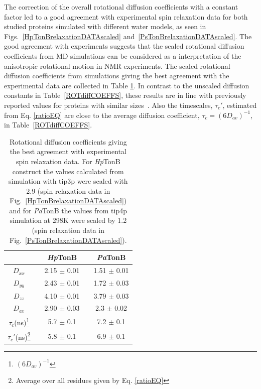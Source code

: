 \documentclass[pre,aps,floatfix,authordate1-4,twocolumn]{revtex4-1}
\begin{document}
The correction of the overall rotational diffusion coefficients
with a constant factor led to a good agreement with experimental
spin relaxation data for both studied proteins simulated with different water models,
as seen in Figs.~\ref{HpTonBrelaxationDATAscaled} and~\ref{PsTonBrelaxationDATAscaled}.
The good agreement with experiments suggests that the scaled rotational diffusion coefficients
from MD simulations can be considered as a interpretation of the anisotropic rotational motion in NMR experiments.
The scaled rotational diffusion coefficients from simulations giving the best agreement
with the experimental data are collected in Table \ref{ROTdiffCOEFFSscaled}.
In contrast to the unscaled diffusion constants in Table~\ref{ROTdiffCOEFFS},
these results are in line with previously reported values for proteins
with similar sizes~\cite{krishnan98}. Also the timescales, $\tau_{c}'$, estimated from 
Eq. \ref{ratioEQ} are close to the average diffusion coefficient, $\tau_{c}=(6D_{av})^{-1}$,
in Table~\ref{ROTdiffCOEFFS}.
\begin{table}[!h]
  \centering
  \caption{Rotational diffusion coefficients giving the best agreement with experimental spin relaxation data.
    For {\it Hp}TonB construct the values calculated from simulation with tip3p were scaled with 2.9
    (spin relaxation data in Fig.~\ref{HpTonBrelaxationDATAscaled}) and  for {\it Pa}TonB
    the values from tip4p simulation at 298K were scaled by 1.2 (spin relaxation data in
    Fig.~\ref{PsTonBrelaxationDATAscaled}). 
  }\label{ROTdiffCOEFFSscaled}
  \begin{tabular}{c c c c c}
    &    &  {\it Hp}TonB  &  & {\it Pa}TonB \\
    \hline
    $D_{xx}$        &    &   2.15 $\pm$ 0.01  & & 1.51  $\pm$ 0.01\\
    $D_{yy}$        &    &  2.43  $\pm$ 0.01  & & 1.72  $\pm$ 0.03\\
    $D_{zz}$        &    &  4.10   $\pm$ 0.01 & & 3.79  $\pm$ 0.03\\
    $D_{av}$        &    &   2.90  $\pm$ 0.03  & & 2.3  $\pm$ 0.02\\
    $\tau_{c}$(ns)\footnote{$(6D_{av})^{-1}$}  &    &  5.7   $\pm$ 0.1  & & 7.2 $\pm$ 0.1 \\
    $\tau_{c}'$(ns)\footnote{Average over all residues given by Eq. \ref{ratioEQ}}  &    &  5.8   $\pm$ 0.1 & & 6.9   $\pm$ 0.1 \\
\end{tabular}
\end{table} 
\end{document}
